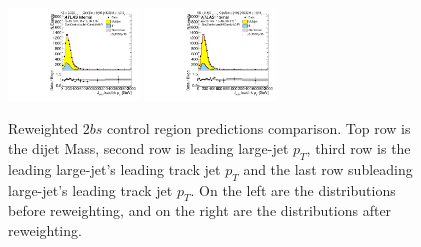 \begin{figure}[htbp!]
\begin{center}
\includegraphics[width=0.31\textwidth,angle=-90]{figures/boosted/Prereweight/Moriond_TwoTag_split_Control_sublHCand_trk0_Pt.pdf}
\includegraphics[width=0.31\textwidth,angle=-90]{figures/boosted/Control/b77_TwoTag_split_Control_sublHCand_trk0_Pt.pdf}\\
\caption{Reweighted $2bs$ control region predictions comparison. Top row is the dijet Mass, second row is leading large-\R jet $p_{T}$, third row is the leading large-\R jet's leading track jet $p_T$ and the last row subleading large-\R jet's leading track jet $p_T$. On the left are the distributions before reweighting, and on the right are the distributions after reweighting.}
\label{fig:rw-2bs-comp-cr}
\end{center}
\end{figure}


